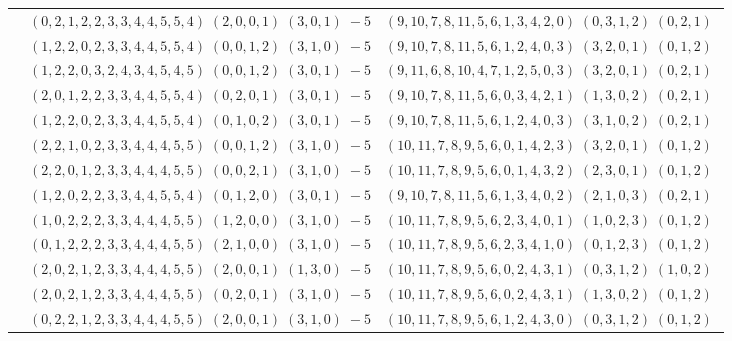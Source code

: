 \documentclass[11pt]{article}
\begin{document}
\begin{longtable}[l]{|c|c|c|}
 \cline{2-3} 
 & $(0 ,2 ,1 ,2 ,2 ,3 ,3 ,4 ,4 ,5 ,5 ,4) \;(2 ,0 ,0 ,1) \;(3 ,0 ,1) \;-5$ & $(9 ,10 ,7 ,8 ,11 ,5 ,6 ,1 ,3 ,4 ,2 ,0) \;(0 ,3 ,1 ,2) \;(0 ,2 ,1) \;$\\ 
 \cline{2-3} 
 & $(1 ,2 ,2 ,0 ,2 ,3 ,3 ,4 ,4 ,5 ,5 ,4) \;(0 ,0 ,1 ,2) \;(3 ,1 ,0) \;-5$ & $(9 ,10 ,7 ,8 ,11 ,5 ,6 ,1 ,2 ,4 ,0 ,3) \;(3 ,2 ,0 ,1) \;(0 ,1 ,2) \;$\\ 
 \cline{2-3} 
 & $(1 ,2 ,2 ,0 ,3 ,2 ,4 ,3 ,4 ,5 ,4 ,5) \;(0 ,0 ,1 ,2) \;(3 ,0 ,1) \;-5$ & $(9 ,11 ,6 ,8 ,10 ,4 ,7 ,1 ,2 ,5 ,0 ,3) \;(3 ,2 ,0 ,1) \;(0 ,2 ,1) \;$\\ 
 \cline{2-3} 
 & $(2 ,0 ,1 ,2 ,2 ,3 ,3 ,4 ,4 ,5 ,5 ,4) \;(0 ,2 ,0 ,1) \;(3 ,0 ,1) \;-5$ & $(9 ,10 ,7 ,8 ,11 ,5 ,6 ,0 ,3 ,4 ,2 ,1) \;(1 ,3 ,0 ,2) \;(0 ,2 ,1) \;$\\ 
 \cline{2-3} 
 & $(1 ,2 ,2 ,0 ,2 ,3 ,3 ,4 ,4 ,5 ,5 ,4) \;(0 ,1 ,0 ,2) \;(3 ,0 ,1) \;-5$ & $(9 ,10 ,7 ,8 ,11 ,5 ,6 ,1 ,2 ,4 ,0 ,3) \;(3 ,1 ,0 ,2) \;(0 ,2 ,1) \;$\\ 
 \cline{2-3} 
 & $(2 ,2 ,1 ,0 ,2 ,3 ,3 ,4 ,4 ,4 ,5 ,5) \;(0 ,0 ,1 ,2) \;(3 ,1 ,0) \;-5$ & $(10 ,11 ,7 ,8 ,9 ,5 ,6 ,0 ,1 ,4 ,2 ,3) \;(3 ,2 ,0 ,1) \;(0 ,1 ,2) \;$\\ 
 \cline{2-3} 
 & $(2 ,2 ,0 ,1 ,2 ,3 ,3 ,4 ,4 ,4 ,5 ,5) \;(0 ,0 ,2 ,1) \;(3 ,1 ,0) \;-5$ & $(10 ,11 ,7 ,8 ,9 ,5 ,6 ,0 ,1 ,4 ,3 ,2) \;(2 ,3 ,0 ,1) \;(0 ,1 ,2) \;$\\ 
 \cline{2-3} 
 & $(1 ,2 ,0 ,2 ,2 ,3 ,3 ,4 ,4 ,5 ,5 ,4) \;(0 ,1 ,2 ,0) \;(3 ,0 ,1) \;-5$ & $(9 ,10 ,7 ,8 ,11 ,5 ,6 ,1 ,3 ,4 ,0 ,2) \;(2 ,1 ,0 ,3) \;(0 ,2 ,1) \;$\\ 
 \cline{2-3} 
 & $(1 ,0 ,2 ,2 ,2 ,3 ,3 ,4 ,4 ,4 ,5 ,5) \;(1 ,2 ,0 ,0) \;(3 ,1 ,0) \;-5$ & $(10 ,11 ,7 ,8 ,9 ,5 ,6 ,2 ,3 ,4 ,0 ,1) \;(1 ,0 ,2 ,3) \;(0 ,1 ,2) \;$\\ 
 \cline{2-3} 
 & $(0 ,1 ,2 ,2 ,2 ,3 ,3 ,4 ,4 ,4 ,5 ,5) \;(2 ,1 ,0 ,0) \;(3 ,1 ,0) \;-5$ & $(10 ,11 ,7 ,8 ,9 ,5 ,6 ,2 ,3 ,4 ,1 ,0) \;(0 ,1 ,2 ,3) \;(0 ,1 ,2) \;$\\ 
 \cline{2-3} 
 & $(2 ,0 ,2 ,1 ,2 ,3 ,3 ,4 ,4 ,4 ,5 ,5) \;(2 ,0 ,0 ,1) \;(1 ,3 ,0) \;-5$ & $(10 ,11 ,7 ,8 ,9 ,5 ,6 ,0 ,2 ,4 ,3 ,1) \;(0 ,3 ,1 ,2) \;(1 ,0 ,2) \;$\\ 
 \cline{2-3} 
 & $(2 ,0 ,2 ,1 ,2 ,3 ,3 ,4 ,4 ,4 ,5 ,5) \;(0 ,2 ,0 ,1) \;(3 ,1 ,0) \;-5$ & $(10 ,11 ,7 ,8 ,9 ,5 ,6 ,0 ,2 ,4 ,3 ,1) \;(1 ,3 ,0 ,2) \;(0 ,1 ,2) \;$\\ 
 \cline{2-3} 
 & $(0 ,2 ,2 ,1 ,2 ,3 ,3 ,4 ,4 ,4 ,5 ,5) \;(2 ,0 ,0 ,1) \;(3 ,1 ,0) \;-5$ & $(10 ,11 ,7 ,8 ,9 ,5 ,6 ,1 ,2 ,4 ,3 ,0) \;(0 ,3 ,1 ,2) \;(0 ,1 ,2) \;$\\ 

\end{longtable}
\end{document}
